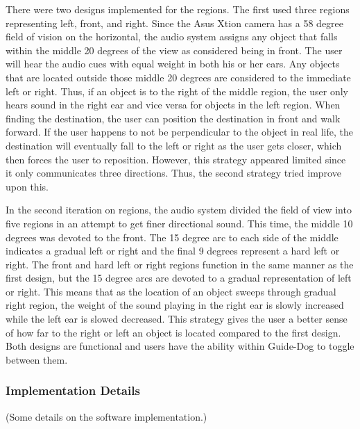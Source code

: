 There were two designs implemented for the regions. The first used three regions
representing left, front, and right. Since the Asus Xtion camera has a 58 degree
field of vision on the horizontal, the audio system assigns any object that
falls within the middle 20 degrees of the view as considered being in front. The
user will hear the audio cues with equal weight in both his or her ears. Any
objects that are located outside those middle 20 degrees are considered to the
immediate left or right. Thus, if an object is to the right of the middle region,
the user only hears sound in the right ear and vice versa for objects in the
left region. When finding the destination, the user can position the destination
in front and walk forward. If the user happens to not be perpendicular to the
object in real life, the destination will eventually fall to the left or right
as the user gets closer, which then forces the user to reposition. However, this
strategy appeared limited since it only communicates three directions. Thus, the
second strategy tried improve upon this.

In the second iteration on regions, the audio system divided the field of view
into five regions in an attempt to get finer directional sound. This time, the
middle 10 degrees was devoted to the front. The 15 degree arc to each side of 
the middle indicates a gradual left or right and the final 9 degrees represent
a hard left or right. The front and hard left or right regions function in the 
same manner as the first design, but the 15 degree arcs are devoted to a gradual
representation of left or right. This means that as the location of an object
sweeps through gradual right region, the weight of the sound playing in the
right ear is slowly increased while the left ear is slowed decreased. This 
strategy gives the user a better sense of how far to the right or left an object
is located compared to the first design. Both designs are functional and users
have the ability within Guide-Dog to toggle between them.

\subsubsection{Implementation Details}
\label{sec:audio-impl}

(Some details on the software implementation.)
